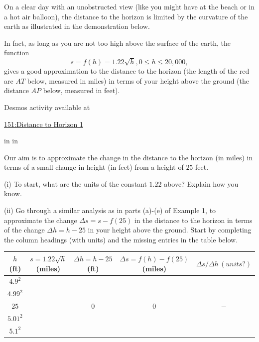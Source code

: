 \documentclass{ximera}
\newcommand{\pskip}{\vskip 0.1 in}
\begin{document}
\begin{question}  \label{Q435rdfgbyt}
On a clear day with an unobstructed view (like you might have at the beach or in a hot air balloon), the distance to the horizon is limited by the curvature of the earth as illustrated in the demonstration below.

In fact, as long as you are not too high above the surface of the earth, the function
\[
      s = f(h) = 1.22\sqrt{h}, 0\leq h \leq 20,000,
\]
gives a good approximation to the distance to the horizon (the length of the red arc $AT$ below, measured in miles) in terms of your height above the ground (the distance $AP$ below, measured in feet).


 
\begin{onlineOnly}
    \begin{center}
\end{center}
\end{onlineOnly}

Desmos activity available at

\href{https://www.desmos.com/calculator/ewowig5sgk}{151:Distance to Horizon 1}

\pskip \pskip

Our aim is to approximate the change in the distance to the horizon (in miles) in terms of a small change in height (in feet) from a height of $25$ feet.

(i) To start, what are the units of the constant $1.22$ above? Explain how  you know.

\begin{freeResponse}
\end{freeResponse}

(ii) Go through a similar analysis as in parts (a)-(e) of Example 1, to approximate the change $\Delta s = s - f(25)$ in the distance to the horizon in terms of the change $\Delta h = h-25$ in your height above the ground. Start by completing the column headings (with units) and the missing entries in the table below.

\begin{center}
  \begin{tabular}{ | c| c | c | c | c |}
    \hline
    $h$ (ft) & $s = 1.22\sqrt{h}$ (miles) & $\Delta h = h-25$ (ft)  & $\Delta s =f(h) - f(25)$ (miles) & $\Delta s/\Delta h \, (units?)$ \\ \hline
    $4.9^2$ &  &  &   & \\ \hline
    $4.99^2$ &  &  &   &  \\ \hline
    $25$  &  & $0$ & $0$ & $-$  \\ \hline
    $5.01^2$ &  &  &   &  \\ \hline
    $5.1^2$ &  &  &   &  \\ \hline
    \hline
  \end{tabular}
\end{center}

\end{question}
\end{document}
